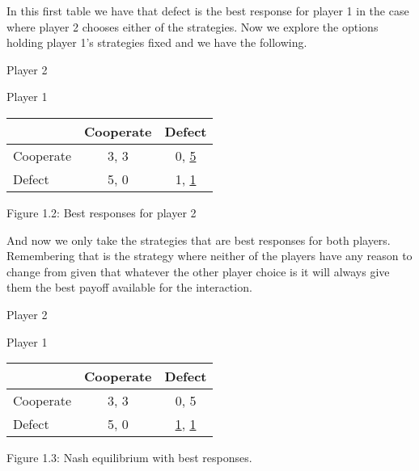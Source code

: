 \documentclass{article}
\begin{document}
In this first table we have that defect is the best response for player 1 in the case where player 2 chooses either of the strategies. 
Now we explore the options holding player 1's strategies fixed and we have the following.

\begin{center}
Player 2

Player 1
\begin{tabular}{|l|c|c|}
\hline
 & Cooperate & Defect\\ 
\hline
Cooperate & 3, 3 & 0, \underline{5}\\
\hline
Defect & 5, 0 & 1, \underline{1}\\
\hline
\end{tabular}

Figure 1.2: Best responses for player 2
\end{center}

And now we only take the strategies that are best responses for both players. Remembering that is the strategy where neither of the players have any reason to change from given that whatever the other player choice is it will always give them the best payoff available for the interaction.
 
\begin{center}
Player 2

Player 1
\begin{tabular}{|l|c|c|}
\hline
 & Cooperate & Defect\\ 
\hline
Cooperate & 3, 3 & 0, 5\\
\hline
Defect & 5, 0 & \underline{1}, \underline{1}\\
\hline
\end{tabular}

Figure 1.3: Nash equilibrium with best responses.
\end{center}
\end{document}
